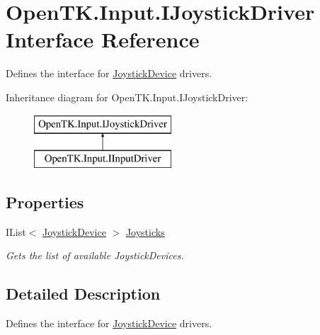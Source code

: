 \hypertarget{interface_open_t_k_1_1_input_1_1_i_joystick_driver}{\section{Open\-T\-K.\-Input.\-I\-Joystick\-Driver Interface Reference}
\label{interface_open_t_k_1_1_input_1_1_i_joystick_driver}
}


Defines the interface for \hyperlink{class_open_t_k_1_1_input_1_1_joystick_device}{Joystick\-Device} drivers.  


Inheritance diagram for Open\-T\-K.\-Input.\-I\-Joystick\-Driver\-:\begin{figure}[H]
\begin{center}
\leavevmode
\includegraphics[height=2.000000cm]{interface_open_t_k_1_1_input_1_1_i_joystick_driver}
\end{center}
\end{figure}
\subsection*{Properties}
\begin{DoxyCompactItemize}
\item 
I\-List$<$ \hyperlink{class_open_t_k_1_1_input_1_1_joystick_device}{Joystick\-Device} $>$ \hyperlink{interface_open_t_k_1_1_input_1_1_i_joystick_driver_abcc28b1127554a446e37bed7d62e5024}{Joysticks}
\begin{DoxyCompactList}\small\item\em Gets the list of available Joystick\-Devices. \end{DoxyCompactList}\end{DoxyCompactItemize}


\subsection{Detailed Description}
Defines the interface for \hyperlink{class_open_t_k_1_1_input_1_1_joystick_device}{Joystick\-Device} drivers. 



